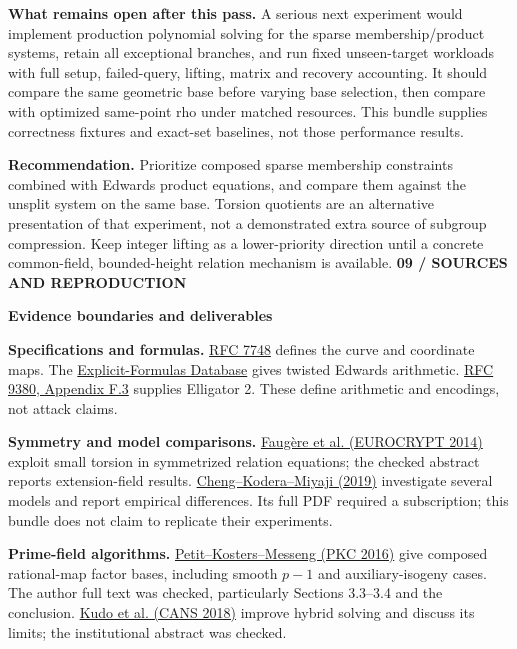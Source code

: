 \documentclass[11pt]{article}
\newcommand{\titleline}[2]{{\small\color{teal}\textbf{#1}}\par{\LARGE\color{ink}\textbf{#2}}\par\vspace{3mm}}
\begin{document}
\textbf{What remains open after this pass.} A serious next experiment would implement production polynomial solving for the sparse membership/product systems, retain all exceptional branches, and run fixed unseen-target workloads with full setup, failed-query, lifting, matrix and recovery accounting. It should compare the same geometric base before varying base selection, then compare with optimized same-point rho under matched resources. This bundle supplies correctness fixtures and exact-set baselines, not those performance results.

\textbf{Recommendation.} Prioritize composed sparse membership constraints combined with Edwards product equations, and compare them against the unsplit system on the same base. Torsion quotients are an alternative presentation of that experiment, not a demonstrated extra source of subgroup compression. Keep integer lifting as a lower-priority direction until a concrete common-field, bounded-height relation mechanism is available.
\newpage
\titleline{09 / SOURCES AND REPRODUCTION}{Evidence boundaries and deliverables}
\small
\textbf{Specifications and formulas.} \href{https://www.rfc-editor.org/rfc/rfc7748.html#section-4.1}{RFC 7748} defines the curve and coordinate maps. The \href{https://www.hyperelliptic.org/EFD/g1p/auto-twisted.html}{Explicit-Formulas Database} gives twisted Edwards arithmetic. \href{https://datatracker.ietf.org/doc/html/rfc9380#appendix-F.3}{RFC 9380, Appendix F.3} supplies Elligator 2. These define arithmetic and encodings, not attack claims.

\textbf{Symmetry and model comparisons.} \href{https://doi.org/10.1007/978-3-642-55220-5_3}{Faug\`ere et al. (EUROCRYPT 2014)} exploit small torsion in symmetrized relation equations; the checked abstract reports extension-field results. \href{https://www.jstage.jst.go.jp/article/transfun/E102.A/9/E102.A_1061/_article/-char/en}{Cheng--Kodera--Miyaji (2019)} investigate several models and report empirical differences. Its full PDF required a subscription; this bundle does not claim to replicate their experiments.

\textbf{Prime-field algorithms.} \href{https://christophe.petit.web.ulb.be/files/16PKC_primeECDLP.pdf}{Petit--Kosters--Messeng (PKC 2016)} give composed rational-map factor bases, including smooth $p-1$ and auxiliary-isogeny cases. The author full text was checked, particularly Sections 3.3--3.4 and the conclusion. \href{https://kyushu-u.elsevierpure.com/en/publications/acceleration-of-index-calculus-for-solving-ecdlp-over-prime-field/}{Kudo et al. (CANS 2018)} improve hybrid solving and discuss its limits; the institutional abstract was checked.
\end{document}
